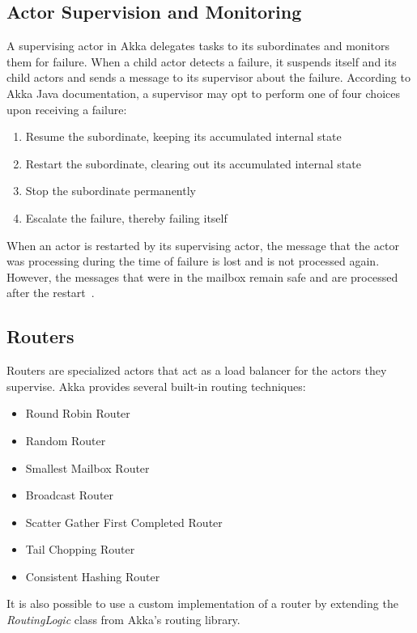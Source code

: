   \subsection{Actor Supervision and Monitoring}
  \label{subsec:supervisionMonitoring}
  A supervising actor in Akka delegates tasks to its subordinates and monitors them for failure. When a child actor detects a failure, it suspends itself and its child actors and sends a message to its supervisor about the failure. According to Akka Java documentation\cite{akkaJavaDoc}, a supervisor may opt to perform one of four choices upon receiving a failure:
  \begin{enumerate}
    \item Resume the subordinate, keeping its accumulated internal state
    \item Restart the subordinate, clearing out its accumulated internal state
    \item Stop the subordinate permanently
    \item Escalate the failure, thereby failing itself
  \end{enumerate}

  When an actor is restarted by its supervising actor, the message that the actor was processing during the time of failure is lost and is not processed again. However, the messages that were in the mailbox remain safe and are processed after the restart~\cite{akkaJavaDoc}.

  \subsection{Routers}
  \label{subsec:akka-routers}
  Routers are specialized actors that act as a load balancer for the actors they supervise. Akka provides several built-in routing techniques:~\cite{akkaJavaDoc}
  \begin{itemize}
    \item Round Robin Router
    \item Random Router
    \item Smallest Mailbox Router
    \item Broadcast Router
    \item Scatter Gather First Completed Router
    \item Tail Chopping Router
    \item Consistent Hashing Router
  \end{itemize}

It is also possible to use a custom implementation of a router by extending the \emph{RoutingLogic} class from Akka's routing library.

